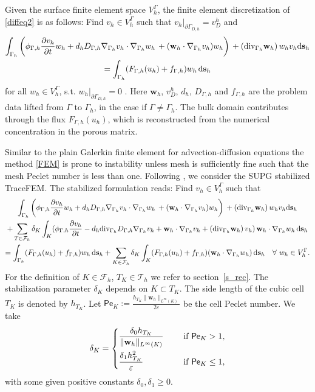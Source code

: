 \documentclass{article}
\let\eps\varepsilon
\def\ds{\mathrm{d}\mathbf{s}}
\newcommand{\bw}{\mathbf w}
\newcommand{\T}{\mathcal T}
\newcommand{\Div}{\mbox{\rm div}}
\def\nath{\nabla_{\Gamma_h}}
\begin{document}
Given the surface finite element space $V_h^{\Gamma}$,  the finite element
discretization of \eqref{diffeq2} is as follows:   Find $v_h\in V_h^{\Gamma}$ such that $v_h|_{\partial\Gamma_{D,h}}=v_D^h$ and
\begin{multline}
\int_{\Gamma_h}\left(  \phi_{\Gamma,h}\frac{\partial v_h}{\partial t}w_h +  d_h D_{\Gamma,h}\nath v_h\cdot\nath w_h\, +(\bw_h\cdot\nath v_h) w_h\right)\, + (\Div_{\Gamma_h}\bw_h) \, {w_h}v_h \ds_h\\ =\int_{\Gamma_h}( F_{\Gamma,h}(u_h)+ f_{\Gamma,h}) w_h\, \ds_h \label{FEM}
\end{multline}
for all $w_h\in V_h^{\Gamma}$, s.t. $w_h|_{\partial\Gamma_{D,h}}=0$ . Here $\mathbf{w}_h$, $v_D^h$, $d_h$, $D_{\Gamma,h}$ and $f_{\Gamma,h}$ are  the problem data lifted from $\Gamma$ to $\Gamma_h$, in the case if $\Gamma\neq\Gamma_h$. The bulk domain contributes through the flux $F_{\Gamma,h}(u_h)$, which is reconstructed from the numerical concentration in the porous matrix. %

Similar to the plain Galerkin finite element for  advection-diffusion equations the method \eqref{FEM} is prone to instability unless mesh is sufficiently fine such that the mesh Peclet number is less than one.
Following \cite{ORXimanum}, we consider the SUPG stabilized TraceFEM.  The stabilized formulation reads:
 Find $v_h\in V_h^{\Gamma}$ such that
\begin{multline}
 \int_{\Gamma_h}\left(  \phi_{\Gamma,h}\frac{\partial v_h}{\partial t}w_h +  d_h D_{\Gamma,h}\nath v_h\cdot\nath w_h\, +(\bw_h\cdot\nath v_h) w_h\right)\, + (\Div_{\Gamma_h}\bw_h) \, {w_h}v_h \ds_h \\
  +\sum_{{T}\in\mathcal{F}_h}\delta_K\int_{K}(\phi_{\Gamma,h}\frac{\partial v_h}{\partial t}-{d_h\Div_{\Gamma_h}D_{\Gamma,h}\nabla_{\Gamma_h}}v_h + \bw_h\cdot\nath v_h + (\Div_{\Gamma_h}\bw_h) \, v_h)\,\bw_h\cdot\nath w_h\, \ds_h\\ =\int_{\Gamma_h}( F_{\Gamma,h}(u_h)+ f_{\Gamma,h}) w_h\, \ds_h + \sum_{K\in\mathcal{F}_h}\delta_K\int_{K}( F_{\Gamma,h}(u_h)+ f_{\Gamma,h})(\bw_h\cdot\nath w_h)\, \ds_h\quad \forall~ w_h\in V_h^{\Gamma}. \label{FEM_SUPG}
\end{multline}
{For the definition of $K\in\mathcal{F}_h$, $T_K\in\T_h$ we refer to section~\ref{s_rec}.}
The stabilization parameter  $\delta_K$ depends on $K \subset T_K$. The side length of the cubic cell $T_K$ is denoted by $h_{T_K}$.  Let $\displaystyle \mathsf{Pe}_K:=\frac{h_{T_K} \|\mathbf{w}_h\|_{L^\infty(K)}}{2\eps}$
be the cell Peclet number.
We take
\begin{equation}
 {\delta_K}=
\left\{
\begin{aligned}
&\frac{\delta_0 h_{T_K}}{\|\mathbf{w}_h\|_{L^\infty(K)}} &&\quad \hbox{ if } \mathsf{Pe}_K> 1,\\
&\frac{\delta_1 h^2_{T_K}}{\eps}  &&\quad \hbox{ if } \mathsf{Pe}_K\leq 1,
\end{aligned}
\right. \label{e:2.10}
\end{equation}
with some given positive constants  $\delta_0,\delta_1\geq 0$.
\end{document}
